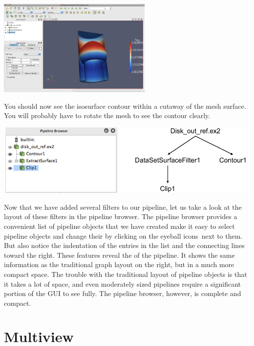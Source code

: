 \begin{inlinefig}
  \includegraphics[width=3in]{images/CutSurface2}
\end{inlinefig}

You should now see the isosurface contour within a cutaway of the mesh
surface.  You will probably have to rotate the mesh to see the contour
clearly.

\begin{inlinefig}
  \includegraphics[width=\linewidth]{images/PipelineBrowserStructure}
\end{inlinefig}

Now that we have added several filters to our pipeline, let us take a look
at the layout of these filters in the pipeline browser.  The pipeline
browser provides a convenient list of pipeline objects that we have created
make it easy to select pipeline objects and change their
 by clicking on the eyeball icons~\eyeball next to
them.  But also notice the indentation of the entries in the list and the
connecting lines toward the right.  These features reveal the
 of the pipeline.  It shows the same information as
the traditional graph layout on the right, but in a much more compact
space.  The trouble with the traditional layout of pipeline objects is that
it takes a lot of space, and even moderately sized pipelines require a
significant portion of the GUI to see fully.  The pipeline browser,
however, is complete and compact.


\section{Multiview}
\label{sec:Multiview}

